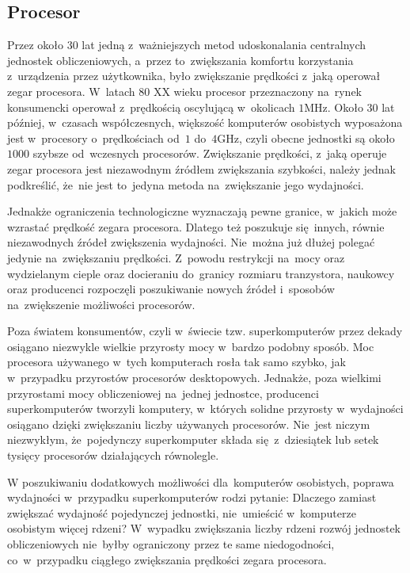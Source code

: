 \subsection{Procesor}\label{03-procesor}
Przez około 30 lat jedną z~ważniejszych metod udoskonalania centralnych jednostek obliczeniowych, a~przez to~zwiększania komfortu korzystania z~urządzenia przez użytkownika, było zwiększanie prędkości z~jaką operował zegar procesora. W~latach 80 XX wieku procesor przeznaczony na~rynek konsumencki operował z~prędkością oscylującą w~okolicach $1$MHz. Około 30 lat później, w~czasach współczesnych, większość komputerów osobistych wyposażona jest w~procesory o~prędkościach od~$1$ do~$4$GHz, czyli obecne jednostki są około $1000$ szybsze od~wczesnych procesorów. Zwiększanie prędkości, z~jaką operuje zegar procesora jest niezawodnym źródłem zwiększania szybkości, należy jednak podkreślić, że~nie jest to~jedyna metoda na~zwiększanie jego wydajności.

Jednakże ograniczenia technologiczne wyznaczają pewne granice, w~jakich może wzrastać prędkość zegara procesora. Dlatego też poszukuje się~innych, równie niezawodnych źródeł zwiększenia wydajności. Nie~można już dłużej polegać jedynie na~zwiększaniu prędkości. Z~powodu restrykcji na~mocy oraz wydzielanym cieple oraz docieraniu do~granicy rozmiaru tranzystora, naukowcy oraz producenci rozpoczęli poszukiwanie nowych źródeł i~sposobów na~zwiększenie możliwości procesorów.

Poza światem konsumentów, czyli w~świecie tzw. superkomputerów przez dekady osiągano niezwykle wielkie przyrosty mocy w~bardzo podobny sposób. Moc procesora używanego w~tych komputerach rosła tak samo szybko, jak w~przypadku przyrostów procesorów desktopowych. Jednakże, poza wielkimi przyrostami mocy obliczeniowej na~jednej jednostce, producenci superkomputerów tworzyli komputery, w~których solidne przyrosty w~wydajności osiągano dzięki zwiększaniu liczby używanych procesorów. Nie~jest niczym niezwykłym, że~pojedynczy superkomputer składa się~z~dziesiątek lub setek tysięcy procesorów działających równolegle.

W poszukiwaniu dodatkowych możliwości dla~komputerów osobistych, poprawa wydajności w~przypadku superkomputerów rodzi pytanie: Dlaczego zamiast zwiększać wydajność pojedynczej jednostki, nie~umieścić w~komputerze osobistym więcej rdzeni? W~wypadku zwiększania liczby rdzeni rozwój jednostek obliczeniowych nie~byłby ograniczony przez te same niedogodności, co~w~przypadku ciągłego zwiększania prędkości zegara procesora.

